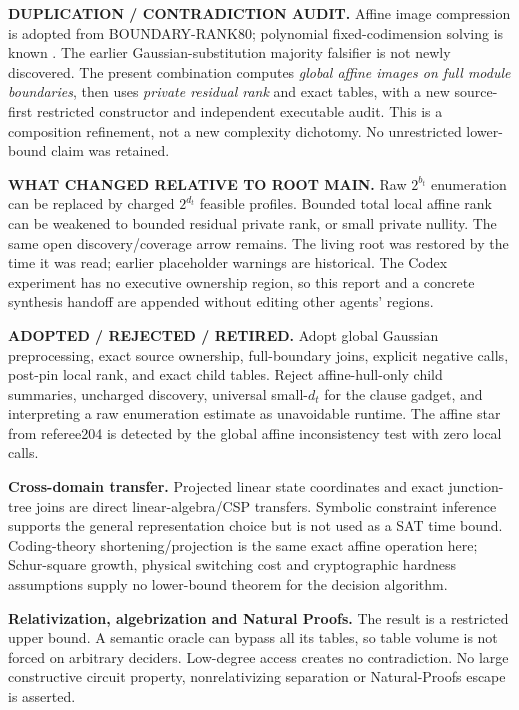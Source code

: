\documentclass[11pt]{article}
\begin{document}
\textbf{DUPLICATION / CONTRADICTION AUDIT.} Affine image compression is adopted from BOUNDARY-RANK80; polynomial fixed-codimension solving is known \cite{AG2021}. The earlier Gaussian-substitution majority falsifier is not newly discovered. The present combination computes \emph{global affine images on full module boundaries}, then uses \emph{private residual rank} and exact tables, with a new source-first restricted constructor and independent executable audit. This is a composition refinement, not a new complexity dichotomy. No unrestricted lower-bound claim was retained.

\textbf{WHAT CHANGED RELATIVE TO ROOT MAIN.} Raw $2^{b_t}$ enumeration can be replaced by charged $2^{d_t}$ feasible profiles. Bounded total local affine rank can be weakened to bounded residual private rank, or small private nullity. The same open discovery/coverage arrow remains. The living root was restored by the time it was read; earlier placeholder warnings are historical. The Codex experiment has no executive ownership region, so this report and a concrete synthesis handoff are appended without editing other agents' regions.

\textbf{ADOPTED / REJECTED / RETIRED.} Adopt global Gaussian preprocessing, exact source ownership, full-boundary joins, explicit negative calls, post-pin local rank, and exact child tables. Reject affine-hull-only child summaries, uncharged discovery, universal small-$d_t$ for the clause gadget, and interpreting a raw enumeration estimate as unavoidable runtime. The affine star from referee204 is detected by the global affine inconsistency test with zero local calls.

\textbf{Cross-domain transfer.} Projected linear state coordinates and exact junction-tree joins are direct linear-algebra/CSP transfers. Symbolic constraint inference \cite{SW2005} supports the general representation choice but is not used as a SAT time bound. Coding-theory shortening/projection is the same exact affine operation here; Schur-square growth, physical switching cost and cryptographic hardness assumptions supply no lower-bound theorem for the decision algorithm.

\textbf{Relativization, algebrization and Natural Proofs.} The result is a restricted upper bound. A semantic oracle can bypass all its tables, so table volume is not forced on arbitrary deciders. Low-degree access creates no contradiction. No large constructive circuit property, nonrelativizing separation or Natural-Proofs escape is asserted.
\end{document}
